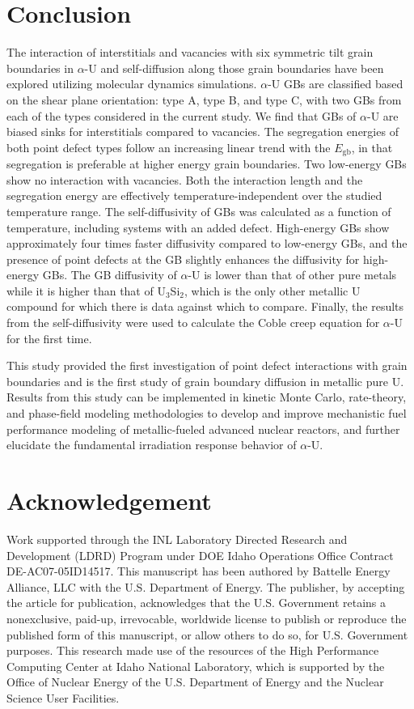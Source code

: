 \documentclass[review]{elsarticle}
\begin{document}
\section{Conclusion}
The interaction of interstitials and vacancies with six symmetric tilt grain boundaries in $\alpha$-U and self-diffusion along those grain boundaries have been explored utilizing molecular dynamics simulations. $\alpha$-U GBs are classified based on the shear plane orientation: type A, type B, and type C, with two GBs from each of the types considered in the current study. We find that GBs of $\alpha$-U are biased sinks for interstitials compared to vacancies. The segregation energies of both point defect types follow an increasing linear trend with the $E_{\mathrm{gb}}$, in that segregation is preferable at higher energy grain boundaries. Two low-energy GBs show no interaction with vacancies. Both the interaction length and the segregation energy are effectively temperature-independent over the studied temperature range. The self-diffusivity of GBs was calculated as a function of temperature, including systems with an added defect. High-energy GBs show approximately four times faster diffusivity compared to low-energy GBs, and the presence of point defects at the GB slightly enhances the diffusivity for high-energy GBs. The GB diffusivity of $\alpha$-U is lower than that of other pure metals while it is higher than that of U$_3$Si$_2$, which is the only other metallic U compound for which there is data against which to compare. Finally, the results from the self-diffusivity were used to calculate the Coble creep equation for $\alpha$-U for the first time.

This study provided the first investigation of point defect interactions with grain boundaries and is the first study of grain boundary diffusion in metallic pure U. Results from this study can be implemented in kinetic Monte Carlo, rate-theory, and phase-field modeling methodologies to develop and improve mechanistic fuel performance modeling of metallic-fueled advanced nuclear reactors, and further elucidate the fundamental irradiation response behavior of $\alpha$-U. 
 
\section{Acknowledgement}
Work supported through the INL Laboratory Directed Research and Development (LDRD) Program under DOE Idaho Operations Office Contract DE-AC07-05ID14517. This manuscript has been authored by Battelle Energy Alliance, LLC with the U.S. Department of Energy. The publisher, by accepting the article for publication, acknowledges that the U.S. Government retains a nonexclusive, paid-up, irrevocable, worldwide license to publish or reproduce the published form of this manuscript, or allow others to do so, for U.S. Government purposes. This research made use of the resources of the High Performance Computing Center at Idaho National Laboratory, which is supported by the Office of Nuclear Energy of the U.S. Department of Energy and the Nuclear Science User Facilities.
\end{document}
